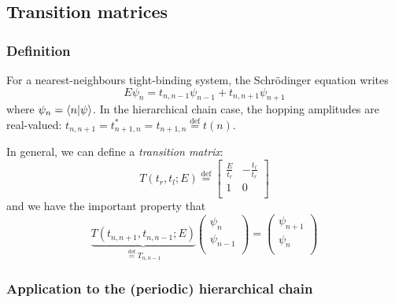 \documentclass[11pt]{article}
\newcommand{\define}{\ensuremath{ \overset{\text{def}}{=} }}
\begin{document}
\subsection{Transition matrices}

\subsubsection{Definition}
For a nearest-neighbours tight-binding system, the Schrödinger equation writes
\begin{equation}
	E \psi_n = t_{n,n-1} \psi_{n-1} + t_{n,n+1} \psi_{n+1}
\end{equation}
where $\psi_n = \braket{n|\psi}$. In the hierarchical chain case, the hopping amplitudes are real-valued: $t_{n,n+1} = t_{n+1,n}^* = t_{n+1,n} \define t(n)$.

In general, we can define a \emph{transition matrix}:
\begin{equation}
	T(t_r,t_l;E) \define 
	\begin{bmatrix}
		\frac{E}{t_r} & -\frac{t_l}{t_r}\\
		1 & 0\\
	\end{bmatrix}
\end{equation}
and we have the important property that
\begin{equation}
	\underbrace{T(t_{n,n+1},t_{n,n-1};E)}_{ \define T_{n,n-1} } 
	\begin{pmatrix}
		\psi_n\\
		\psi_{n-1}\\
	\end{pmatrix}
	= 
	\begin{pmatrix}
		\psi_{n+1}\\
		\psi_{n}\\
	\end{pmatrix}
\end{equation}

\subsubsection{Application to the (periodic) hierarchical chain}
\end{document}
